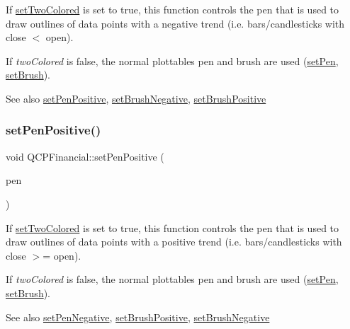 If \hyperlink{classQCPFinancial_a138e44aac160a17a9676652e240c5f08}{set\+Two\+Colored} is set to true, this function controls the pen that is used to draw outlines of data points with a negative trend (i.\+e. bars/candlesticks with close $<$ open).

If {\itshape two\+Colored} is false, the normal plottable\textquotesingle{}s pen and brush are used (\hyperlink{classQCPAbstractPlottable_ab74b09ae4c0e7e13142fe4b5bf46cac7}{set\+Pen}, \hyperlink{classQCPAbstractPlottable_a7a4b92144dca6453a1f0f210e27edc74}{set\+Brush}).

\begin{DoxySeeAlso}{See also}
\hyperlink{classQCPFinancial_ac58aa3adc7a35aab0088764b840683e5}{set\+Pen\+Positive}, \hyperlink{classQCPFinancial_a8bbdd87629f9144b3ef51af660c0961a}{set\+Brush\+Negative}, \hyperlink{classQCPFinancial_a5ebff2b1764efd07cc44942e67821829}{set\+Brush\+Positive} 
\end{DoxySeeAlso}
\mbox{\label{classQCPFinancial_ac58aa3adc7a35aab0088764b840683e5}} 
\subsubsection{\texorpdfstring{set\+Pen\+Positive()}{setPenPositive()}}
{\footnotesize\ttfamily void Q\+C\+P\+Financial\+::set\+Pen\+Positive (\begin{DoxyParamCaption}\item[{const Q\+Pen \&}]{pen }\end{DoxyParamCaption})}

If \hyperlink{classQCPFinancial_a138e44aac160a17a9676652e240c5f08}{set\+Two\+Colored} is set to true, this function controls the pen that is used to draw outlines of data points with a positive trend (i.\+e. bars/candlesticks with close $>$= open).

If {\itshape two\+Colored} is false, the normal plottable\textquotesingle{}s pen and brush are used (\hyperlink{classQCPAbstractPlottable_ab74b09ae4c0e7e13142fe4b5bf46cac7}{set\+Pen}, \hyperlink{classQCPAbstractPlottable_a7a4b92144dca6453a1f0f210e27edc74}{set\+Brush}).

\begin{DoxySeeAlso}{See also}
\hyperlink{classQCPFinancial_afe5c07e94ccea01a75b3a2476993c346}{set\+Pen\+Negative}, \hyperlink{classQCPFinancial_a5ebff2b1764efd07cc44942e67821829}{set\+Brush\+Positive}, \hyperlink{classQCPFinancial_a8bbdd87629f9144b3ef51af660c0961a}{set\+Brush\+Negative} 
\end{DoxySeeAlso}
\mbox{\label{classQCPFinancial_a138e44aac160a17a9676652e240c5f08}} 

